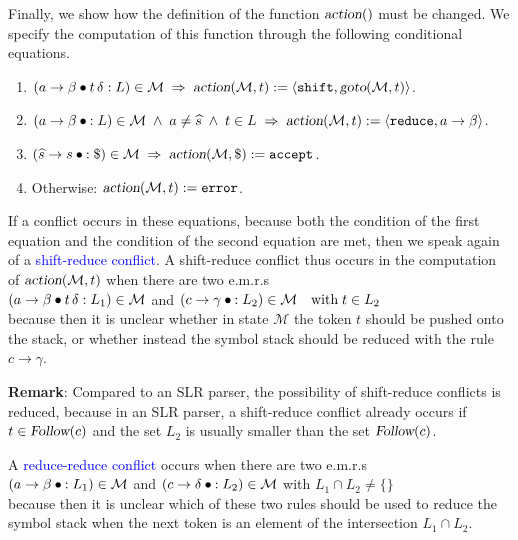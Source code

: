 Finally, we show how the definition of the function $\textsl{action}()$ must be changed.
We specify the computation of this function through the following conditional equations.
\begin{enumerate}
\item $(a \rightarrow \beta \mdot t\, \delta:L) \in \mathcal{M} \;\Rightarrow\;
       \textsl{action}(\mathcal{M},t) := \langle \texttt{shift}, \textsl{goto}(\mathcal{M},t) \rangle$. 
\item $(a \rightarrow \beta \mdot:L) \in \mathcal{M} \;\wedge\; a \not= \widehat{s}
       \;\wedge\; t \in L \;\Rightarrow\;
       \textsl{action}(\mathcal{M},t) := \langle \texttt{reduce}, a \rightarrow \beta \rangle$. 
\item $(\widehat{s} \rightarrow s \mdot:\symbol{36}) \in \mathcal{M} \;\Rightarrow\;
       \textsl{action}(\mathcal{M},\symbol{36}) := \texttt{accept}$. 
\item Otherwise: \quad $\textsl{action}(\mathcal{M},t) := \texttt{error}$. 
\end{enumerate}
If a conflict occurs in these equations, because both the condition
of the first equation and the condition of the second equation are met, then we speak
again of a \textcolor{blue}{shift-reduce conflict}.  
A shift-reduce conflict thus occurs in the computation of
$\textsl{action}(\mathcal{M},t)$ when there are two e.m.r.s 
\\[0.2cm]
\hspace*{1.3cm}
$(a \rightarrow \beta \mdot t\, \delta:L_1) \in \mathcal{M}$ \quad \mbox{and} \quad 
$(c \rightarrow \gamma\mdot :L_2) \in \mathcal{M} \quad \mbox{with}\; t \in L_2$
\\[0.2cm]
because then it is unclear whether in state $\mathcal{M}$ the token $t$ should be pushed onto the stack,
or whether instead the symbol stack should be reduced with the rule $c \rightarrow \gamma$.
\vspace*{0.2cm}

\noindent
\textbf{Remark}: Compared to an SLR parser, the possibility of shift-reduce conflicts is reduced, because in an
SLR parser, a shift-reduce conflict already occurs if $t \in \textsl{Follow}(c)$ and the set $L_2$ is usually
smaller than the set $\textsl{Follow}(c)$. \eox  
\vspace*{0.3cm}

A \textcolor{blue}{reduce-reduce conflict} occurs when there are two e.m.r.s 
\\[0.2cm]
\hspace*{1.3cm}
$(a \rightarrow \beta\mdot:L_1) \in \mathcal{M}$ \quad \mbox{and} \quad 
$(c \rightarrow \delta\mdot:L_2) \in \mathcal{M}$ \quad \mbox{with} \quad $L_1 \cap L_2 \not= \{\}$
\\[0.2cm]
because then it is unclear which of these two rules should be used to reduce the symbol stack when the next
token is an element of the intersection $L_1 \cap L_2$. 
\vspace*{0.2cm}

